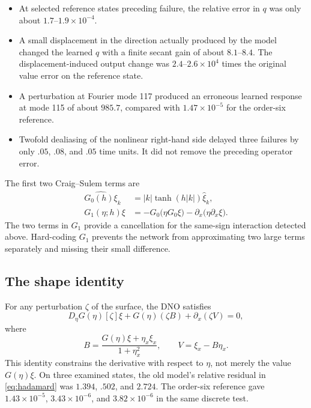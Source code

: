 \documentclass[11pt]{article}
\begin{document}
\begin{itemize}[leftmargin=*]
  \item At selected reference states preceding failure, the relative error in
  $q$ was only about $1.7$--$1.9\times10^{-4}$.

  \item A small displacement in the direction actually produced by the model
  changed the learned $q$ with a finite secant gain of about $8.1$--$8.4$.
  The displacement-induced output change was $2.4$--$2.6\times10^4$ times the
  original value error on the reference state.

  \item A perturbation at Fourier mode 117 produced an erroneous learned
  response at mode 115 of about $985.7$, compared with
  $1.47\times10^{-5}$ for the order-six reference.

  \item Twofold dealiasing of the nonlinear right-hand side delayed three
  failures by only $.05$, $.08$, and $.05$ time units.  It did not remove the
  preceding operator error.
\end{itemize}

The first two Craig--Sulem terms are
\begin{align}
  \widehat{G_0(h)\xi}_k
  &=|k|\tanh(h|k|)\widehat\xi_k,\\
  G_1(\eta;h)\xi
  &=-G_0\bigl(\eta G_0\xi\bigr)
    -\partial_x\bigl(\eta\partial_x\xi\bigr).
  \label{eq:g1}
\end{align}
The two terms in $G_1$ provide a cancellation for the same-sign interaction
detected above.  Hard-coding $G_1$ prevents the network from approximating two
large terms separately and missing their small difference.

\subsection{The shape identity}

For any perturbation $\zeta$ of the surface, the DNO satisfies
\begin{equation}
  D_\eta G(\eta)[\zeta]\xi
  +G(\eta)(\zeta B)+\partial_x(\zeta V)=0,
  \label{eq:hadamard}
\end{equation}
where
\begin{equation}
  B=\frac{G(\eta)\xi+\eta_x\xi_x}{1+\eta_x^2},
  \qquad
  V=\xi_x-B\eta_x.
  \label{eq:BV}
\end{equation}
This identity constrains the derivative with respect to $\eta$, not merely the
value $G(\eta)\xi$.  On three examined states, the old model's relative
residual in \eqref{eq:hadamard} was $1.394$, $.502$, and $2.724$.  The
order-six reference gave $1.43\times10^{-5}$,
$3.43\times10^{-6}$, and $3.82\times10^{-6}$ in the same discrete test.
\end{document}
